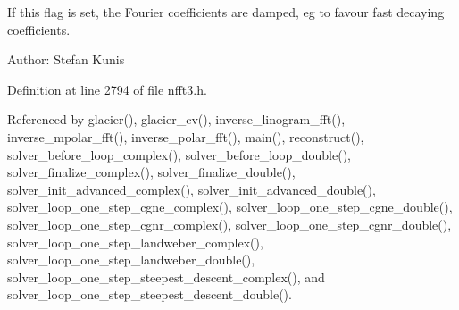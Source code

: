 If this flag is set, the Fourier coefficients are damped, eg to favour fast decaying coefficients. 

\begin{Desc}
\item[Author:]Stefan Kunis \end{Desc}


Definition at line 2794 of file nfft3.h.

Referenced by glacier(), glacier\_\-cv(), inverse\_\-linogram\_\-fft(), inverse\_\-mpolar\_\-fft(), inverse\_\-polar\_\-fft(), main(), reconstruct(), solver\_\-before\_\-loop\_\-complex(), solver\_\-before\_\-loop\_\-double(), solver\_\-finalize\_\-complex(), solver\_\-finalize\_\-double(), solver\_\-init\_\-advanced\_\-complex(), solver\_\-init\_\-advanced\_\-double(), solver\_\-loop\_\-one\_\-step\_\-cgne\_\-complex(), solver\_\-loop\_\-one\_\-step\_\-cgne\_\-double(), solver\_\-loop\_\-one\_\-step\_\-cgnr\_\-complex(), solver\_\-loop\_\-one\_\-step\_\-cgnr\_\-double(), solver\_\-loop\_\-one\_\-step\_\-landweber\_\-complex(), solver\_\-loop\_\-one\_\-step\_\-landweber\_\-double(), solver\_\-loop\_\-one\_\-step\_\-steepest\_\-descent\_\-complex(), and solver\_\-loop\_\-one\_\-step\_\-steepest\_\-descent\_\-double().